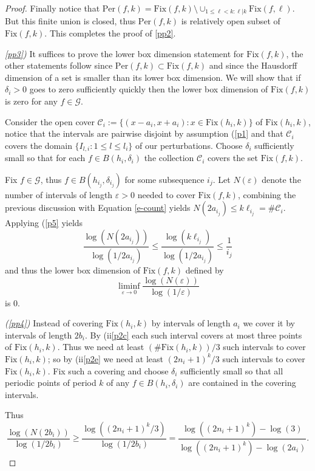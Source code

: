 \documentclass[12pt, a4paper]{amsart}
\def\eps{\varepsilon}
\def\le{\leqslant}
\def\ge{\geqslant}
\def\per{\mathrm{Per}}
\newcommand{\?}{{\bf ???}}
\newcommand{\fix}{\mathrm{Fix}}
\begin{document}
\begin{proof}
Finally notice that $\per(f,k)= \fix(f,k)\setminus \cup_{1 \le \ell < k: \ell | k} \fix(f,\ell)$.
But this finite union is closed, thus $\per(f,k)$ is relatively open subset of $\fix(f,k)$. This completes the proof of \eqref{pp2}.

{\it \ref{pp3})}  It suffices to prove the lower box dimension statement for $\fix(f,k)$, the other statements follow since  $\per(f,k) \subset \fix(f,k)$ and  since the Hausdorff dimension
of a set is smaller than its lower box dimension.
We will show  that if  $\delta_i > 0$ goes to zero sufficiently quickly   then
the lower  box dimension of $\fix(f,k)$ is zero for any $f \in  \mathcal{G}$.

Consider the open cover $\mathcal{C}_i := \{(x-a_i,x+a_i): x \in \fix(h_i,k)\}$ of $\fix(h_i,k)$, notice that
the intervals are pairwise disjoint by assumption (\ref{p1} and that $\mathcal{C}_i$  covers the domain $\{I_{l,i}: 1 \le l \le l_i\}$ of our perturbations.
Choose $\delta_{i}$ sufficiently small so that  for each $f \in B(h_i,\delta_{i})$ the collection $\mathcal{C}_i$ covers the  set
 $\fix(f,k)$.
 
 
Fix $f \in \mathcal{G}$, thus $f \in B(h_{i_j},\delta_{i_j})$  for some subsequence $i_j$.
Let $N(\eps)$ denote the number of intervals of length $\eps > 0$ needed to cover $\fix(f,k)$, combining the previous discussion with   
Equation \eqref{e-count} yields
$N(2a_{i_j}) \le k \ell_{i_j} = \# \mathcal{C}_i$.  Applying (\ref{p5} yields
$$\frac{\log (N(2a_{i_j})) }{\log(1/2a_{i_j})}  \le  \frac{ \log( k\ell_{i_j})}{\log(1/2a_{i_j})} \le \frac{1}{i_j}$$
and thus the lower box dimension of $\fix(f,k)$
defined by
$$\liminf_{\eps \to 0} \frac{\log (N(\eps)) }{\log(1/\eps)}$$
is 0.

{\it (\ref{pp4})}  Instead of covering $\fix(h_i,k)$ by intervals of length $a_i$  we cover it by intervals of length $2b_i$.  
By (ii\ref{p2c} each such interval covers at most three points of $\fix(h_i,k)$.
Thus we need at least $(\# \fix(h_i,k))/3$ such intervals to cover $\fix(h_i,k)$; so by (ii\ref{p2e} we need
 at least $(2n_i+1)^{k}/3$ such intervals to cover $\fix(h_i,k)$.
Fix such a covering and  choose $\delta_i$ sufficiently small so that all periodic points  of period $k$ of any $f \in B(h_{i},\delta_{i})$ are contained in  the covering intervals.


Thus 
\begin{equation}\label{ubd}
\frac{\log (N(2b_{i})) }{\log(1/2b_{i})} \ge  \frac{ \log((2n_i+1)^k/3)}{\log(1/2b_{i})} 
=   \frac{ \log((2n_i+1)^k) - \log(3)}{\log((2n_i+1)^k) - \log(2a_i)}.
\end{equation}


\end{proof}
\end{document}

